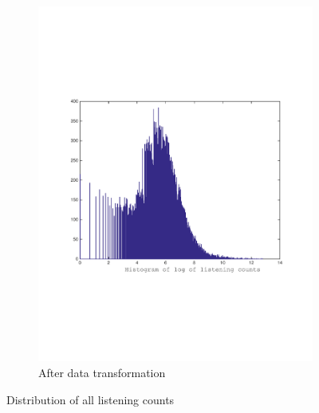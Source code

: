 \begin{figure}[h]
\begin{subfigure}[b]{0.45\textwidth}
    \includegraphics[width=\textwidth]{figures/histLogYtrain_crop.pdf}
    \caption{After data transformation}
  \end{subfigure}
  \caption{Distribution of all listening counts}
  \label{fig:count_distribution}
\end{figure}


